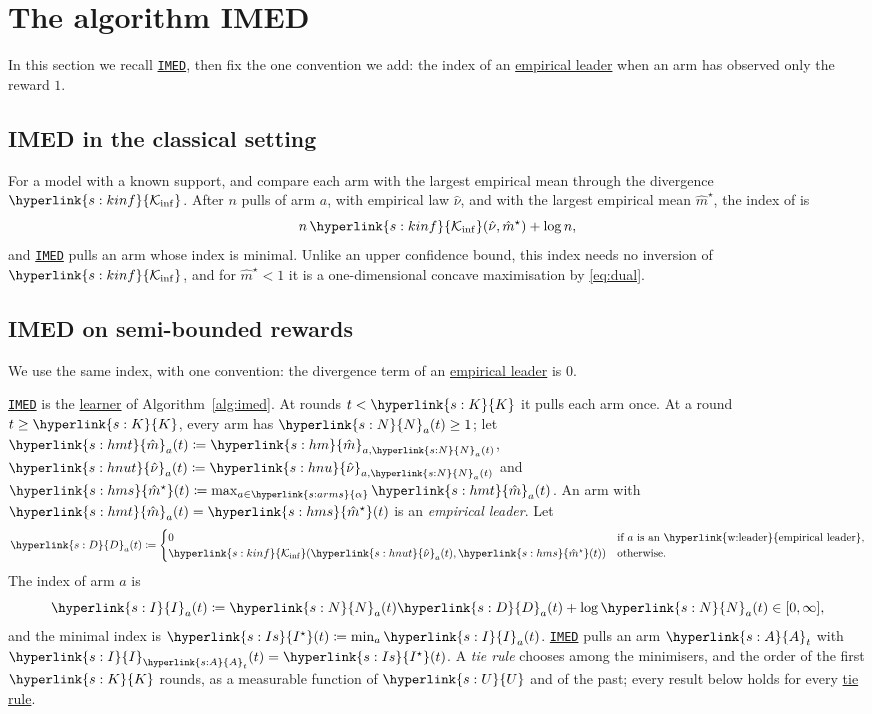 \documentclass[11pt]{article}
\newcommand{\dt}[1]{\hypertarget{#1}{}}
\newcommand{\sy}[2]{{\hyperlink{#1}{#2}}}
\newcommand{\term}[2]{\hyperlink{#1}{#2}}
\newcommand{\imed}{\hyperref[alg:imed]{\texttt{IMED}}}
\newcommand{\arms}{\sy{s:arms}{\alpha}}
\newcommand{\Karms}{\sy{s:K}{K}}
\newcommand{\Kinf}{\sy{s:kinf}{\mathcal{K}_{\inf}}}
\newcommand{\Useed}{\sy{s:U}{U}}
\newcommand{\Ap}{\sy{s:A}{A}}
\newcommand{\Np}{\sy{s:N}{N}}
\newcommand{\hnu}{\sy{s:hnu}{\hat{\nu}}}
\newcommand{\hm}{\sy{s:hm}{\hat{m}}}
\newcommand{\hnut}{\sy{s:hnut}{\hat{\nu}}}
\newcommand{\hmt}{\sy{s:hmt}{\hat{m}}}
\newcommand{\hms}{\sy{s:hms}{\hat{m}^{\star}}}
\newcommand{\Dv}{\sy{s:D}{D}}
\newcommand{\Ix}{\sy{s:I}{I}}
\newcommand{\Is}{\sy{s:Is}{I^{\star}}}
\begin{document}
\section{The algorithm IMED}\label{sec:algorithm}

In this section we recall \imed{}, then fix the one convention we add: the index of an
\term{w:leader}{empirical leader} when an arm has observed only the reward $1$.

\subsection{IMED in the classical setting}

For a model with a known support, \citet{HT10} and \citet[Algorithm~1]{HT15} compare each arm with
the largest empirical mean through the divergence $\Kinf$. After $n$ pulls of arm $a$, with empirical
law $\hat\nu$, and with the largest empirical mean $\hat m^\star$, the index of \citet{HT15} is
\begin{equation*}
  n\,\Kinf(\hat\nu,\hat m^\star)+\log n,
\end{equation*}
and \imed{} pulls an arm whose index is minimal. Unlike an upper confidence bound, this index
needs no inversion of $\Kinf$, and for $\hat m^\star<1$ it is a one-dimensional concave maximisation by
\eqref{eq:dual}.

\subsection{IMED on semi-bounded rewards}

We use the same index, with one convention: the divergence term of an \term{w:leader}{empirical leader} is $0$.

\begin{definition}[IMED]\label{def:imed}
\imed{} is the \term{w:learner}{learner} of Algorithm~\ref{alg:imed}. At rounds $t<\Karms$ it pulls each arm once. At a
round $t\ge \Karms$, every arm has $\Np_a(t)\ge1$; \dt{s:hmt}let $\hmt_a(t)\coloneqq\hm_{a,\Np_a(t)}$,
\dt{s:hnut}$\hnut_a(t)\coloneqq\hnu_{a,\Np_a(t)}$ \dt{s:hms}and $\hms(t)\coloneqq\max_{a\in\arms}\hmt_a(t)$.
\dt{w:leader}An arm with $\hmt_a(t)=\hms(t)$ is an \emph{empirical leader}. \dt{s:D}Let
\[
  \Dv_a(t)\coloneqq\begin{cases}0&\text{if $a$ is an \term{w:leader}{empirical leader},}\\
  \Kinf(\hnut_a(t),\hms(t))&\text{otherwise.}\end{cases}
\]
\dt{s:I}The index of arm $a$ is
\begin{equation}\label{eq:index}
  \Ix_a(t)\coloneqq \Np_a(t)\Dv_a(t)+\log \Np_a(t)\in[0,\infty],
\end{equation}
\dt{s:Is}and the minimal index is $\Is(t)\coloneqq\min_a\Ix_a(t)$. \imed{} pulls an arm $\Ap_t$ with
$\Ix_{\Ap_t}(t)=\Is(t)$. \dt{w:tie}A \emph{tie rule} chooses among the minimisers, and the order of the
first $\Karms$ rounds, as a measurable function of $\Useed$ and of the past; every result below holds for every
\term{w:tie}{tie rule}.
\end{definition}
\end{document}
